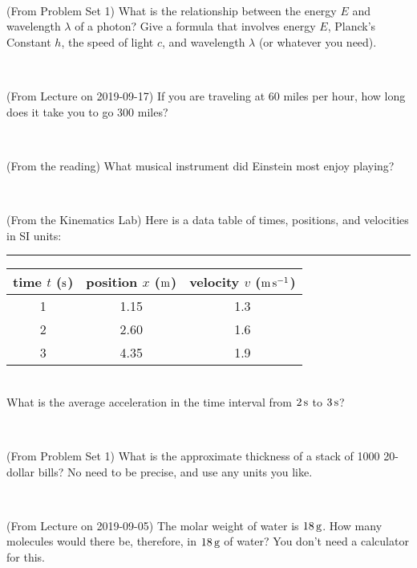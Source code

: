 \documentclass[12pt, letterpaper]{article}
\begin{document}
\vfill ~

\begin{problem} (From Problem Set 1)
What is the relationship between the energy $E$ and wavelength
$\lambda$ of a photon? Give a formula that involves energy $E$,
Planck's Constant $h$, the speed of light $c$, and wavelength
$\lambda$ (or whatever you need).
\end{problem}

\vfill ~

\begin{problem} (From Lecture on 2019-09-17)
If you are traveling at 60 miles per hour, how long does
it take you to go 300 miles?
\end{problem}


\vfill ~

\begin{problem} (From the reading)
What musical instrument did Einstein most enjoy playing?
\end{problem}


\vfill ~


\clearpage


\begin{problem} (From the Kinematics Lab)
Here is a data table of times, positions, and velocities in SI units:\\
\rule{1.0in}{0pt}\begin{tabular}{c|c|c}
time $t$ ($\mathrm{s}$) & position $x$ ($\mathrm{m}$) & velocity $v$ ($\mathrm{m}\,\mathrm{s}^{-1}$) \\
\hline
1 & 1.15 & 1.3 \\
2 & 2.60 & 1.6 \\
3 & 4.35 & 1.9 \\
\hline
\end{tabular}\\
What is the average acceleration in the time interval from $2\,\mathrm{s}$ to $3\,\mathrm{s}$?
\end{problem}


\vfill ~

\begin{problem} (From Problem Set 1)
What is the approximate thickness of a stack of 1000 20-dollar bills?
No need to be precise, and use any units you like.
\end{problem}


\vfill ~

\begin{problem} (From Lecture on 2019-09-05)
The molar weight of water is $18\,\mathrm{g}$. How many molecules would there
be, therefore, in $18\,\mathrm{g}$ of water? You don't need a calculator for
this.
\end{problem}
\end{document}
